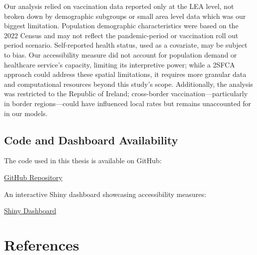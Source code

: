 \documentclass{article}
\begin{document}
Our analysis relied on vaccination data reported only at the LEA level,
not broken down by demographic subgroups or small area level data which
was our biggest limitation. Population demographic characteristics were
based on the 2022 Census and may not reflect the pandemic-period or
vaccination roll out period scenario. Self-reported health status, used
as a covariate, may be subject to bias. Our accessibility measure did
not account for population demand or healthcare service's capacity,
limiting its interpretive power; while a 2SFCA approach could address
these spatial limitations, it requires more granular data and
computational resources beyond this study's scope. Additionally, the
analysis was restricted to the Republic of Ireland; cross-border
vaccination---particularly in border regions---could have influenced
local rates but remains unaccounted for in our models.

\subsection{Code and Dashboard
Availability}\label{code-and-dashboard-availability}

The code used in this thesis is available on GitHub:

\href{https://github.com/Siva-1247/HDS_Project_2425_SN.git}{GitHub
Repository}

An interactive Shiny dashboard showcasing accessibility measures:

\href{https://siva47.shinyapps.io/dashboard/}{Shiny Dashboard}

\section*{References}\label{references}
\end{document}
